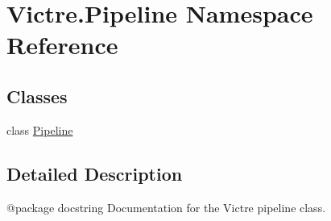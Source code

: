 \hypertarget{namespaceVictre_1_1Pipeline}{\section{Victre.\-Pipeline Namespace Reference}
\label{namespaceVictre_1_1Pipeline}
}
\subsection*{Classes}
\begin{DoxyCompactItemize}
\item 
class \hyperlink{classVictre_1_1Pipeline_1_1Pipeline}{Pipeline}
\end{DoxyCompactItemize}


\subsection{Detailed Description}
\begin{DoxyVerb}@package docstring
Documentation for the Victre pipeline class.
\end{DoxyVerb}
 